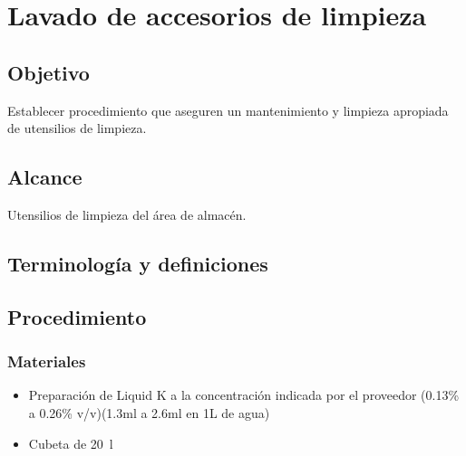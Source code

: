\renewcommand{\MenorVer}{0}
\renewcommand{\Codigo}{HYS-12-IT}
\renewcommand{\FechaPub}{2023--01}
\renewcommand{\Titulo}{Lavado de accesorios de limpieza}

\section{\Titulo}

\subsection{Objetivo}

Establecer procedimiento que aseguren un mantenimiento y limpieza apropiada de utensilios de limpieza.

\subsection{Alcance}

Utensilios de limpieza del área de almacén.

\subsection{Terminología y definiciones}

\begin{description}
\end{description}



\subsection{Procedimiento}

\subsubsection{Materiales}

\begin{itemize}
	\item Preparación de Liquid K a la concentración indicada por el proveedor (0.13\% a 0.26\% v/v)(1.3ml a 2.6ml en 1L de agua)
	\item Cubeta de \qty{20}{\litre}
\end{itemize}

